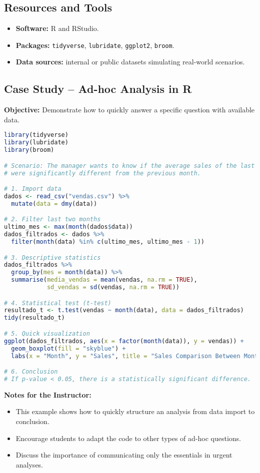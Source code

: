 \subsection{\textcolor{subsectionblue}{Resources and Tools}}
\begin{itemize}
  \item \textbf{Software:} R and RStudio.
  \item \textbf{Packages:} \texttt{tidyverse}, \texttt{lubridate}, \texttt{ggplot2}, \texttt{broom}.
  \item \textbf{Data sources:} internal or public datasets simulating real-world scenarios.
\end{itemize}

\subsection{\textcolor{subsectionblue}{Case Study – Ad-hoc Analysis in R}}
\textbf{Objective:} Demonstrate how to quickly answer a specific question with available data.

\begin{lstlisting}[language=R]
library(tidyverse)
library(lubridate)
library(broom)

# Scenario: The manager wants to know if the average sales of the last month
# were significantly different from the previous month.

# 1. Import data
dados <- read_csv("vendas.csv") %>%
  mutate(data = dmy(data))

# 2. Filter last two months
ultimo_mes <- max(month(dados$data))
dados_filtrados <- dados %>%
  filter(month(data) %in% c(ultimo_mes, ultimo_mes - 1))

# 3. Descriptive statistics
dados_filtrados %>%
  group_by(mes = month(data)) %>%
  summarise(media_vendas = mean(vendas, na.rm = TRUE),
            sd_vendas = sd(vendas, na.rm = TRUE))

# 4. Statistical test (t-test)
resultado_t <- t.test(vendas ~ month(data), data = dados_filtrados)
tidy(resultado_t)

# 5. Quick visualization
ggplot(dados_filtrados, aes(x = factor(month(data)), y = vendas)) +
  geom_boxplot(fill = "skyblue") +
  labs(x = "Month", y = "Sales", title = "Sales Comparison Between Months")

# 6. Conclusion
# If p-value < 0.05, there is a statistically significant difference.
\end{lstlisting}

\textbf{Notes for the Instructor:}
\begin{itemize}
  \item This example shows how to quickly structure an analysis from data import to conclusion.
  \item Encourage students to adapt the code to other types of ad-hoc questions.
  \item Discuss the importance of communicating only the essentials in urgent analyses.
\end{itemize}